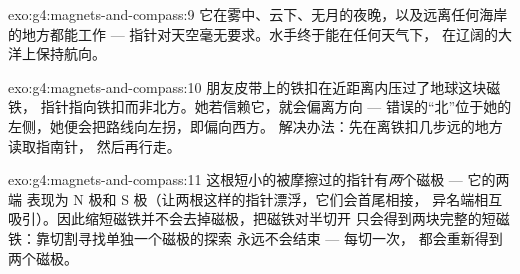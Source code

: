 \begin{solution}{exo:g4:magnets-and-compass:9}
它在雾中、云下、无月的夜晚，以及远离任何海岸的地方都能工作
--- 指针对天空毫无要求。水手终于能在任何天气下，
在辽阔的大洋上保持航向。
\end{solution}

\begin{solution}{exo:g4:magnets-and-compass:10}
朋友皮带上的铁扣在近距离内压过了地球这块磁铁，
指针指向铁扣而非北方。她若信赖它，就会偏离方向 ---
错误的“北”位于她的左侧，她便会把路线向左拐，即偏向西方。
解决办法：先在离铁扣几步远的地方读取指南针，
然后再行走。
\end{solution}

\begin{solution}{exo:g4:magnets-and-compass:11}
这根短小的被摩擦过的指针有\emph{两}个磁极 --- 它的两端
表现为 N 极和 S 极（让两根这样的指针漂浮，它们会首尾相接，
异名端相互吸引）。因此缩短磁铁并不会去掉磁极，把磁铁对半切开
只会得到两块完整的短磁铁：靠切割寻找单独一个磁极的探索
永远不会结束 --- 每切一次，
都会重新得到两个磁极。
\end{solution}
